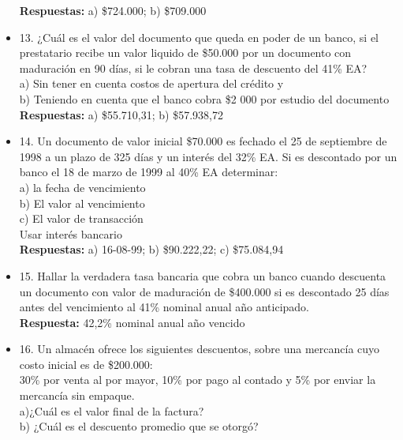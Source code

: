 \begin{itemize}
	\textbf{Respuestas:} a) \$724.000; b) \$709.000
	\medskip
	
	\item 13. ¿Cuál es el valor del documento que queda en poder de un banco, si el prestatario recibe un valor liquido de  \$50.000 por un documento con maduración en 90 días, si le cobran una tasa de descuento del 41\% EA? \\
	
	a) Sin tener en cuenta costos de apertura del crédito y\\
	b) Teniendo en cuenta que el banco cobra \$2 000 por estudio del documento \\
	\textbf{Respuestas:} a) \$55.710,31; b) \$57.938,72
	\medskip
	
	\item 14. Un documento de valor inicial \$70.000 es fechado el 25 de septiembre de 1998 a un plazo de 325 días y un interés del 32\% EA. Si es descontado por un banco el 18 de marzo de 1999 al 40\% EA determinar:\\
	
	a) la fecha de vencimiento\\
	b) El valor al vencimiento\\
	c) El valor de transacción \\
	Usar interés bancario\\
	
	\textbf{Respuestas:} a) 16-08-99; b) \$90.222,22; c) \$75.084,94
	\medskip
	
	\item 15. Hallar la verdadera tasa bancaria que cobra un banco cuando descuenta un documento con valor de maduración de \$400.000 si es descontado 25 días antes del vencimiento al 41\% nominal anual año anticipado.\\
	
	\textbf{Respuesta:} 42,2\% nominal anual año vencido
	
	\item 16. Un almacén ofrece los siguientes descuentos, sobre una mercancía cuyo costo inicial es de \$200.000:\\
	
	30\% por venta al por mayor, 10\% por pago al contado y 5\% por enviar la mercancía sin empaque.\\
	
	a)¿Cuál es el valor final de la factura?\\
	b) ¿Cuál es el descuento promedio que se otorgó?\\
	

\end{itemize}
